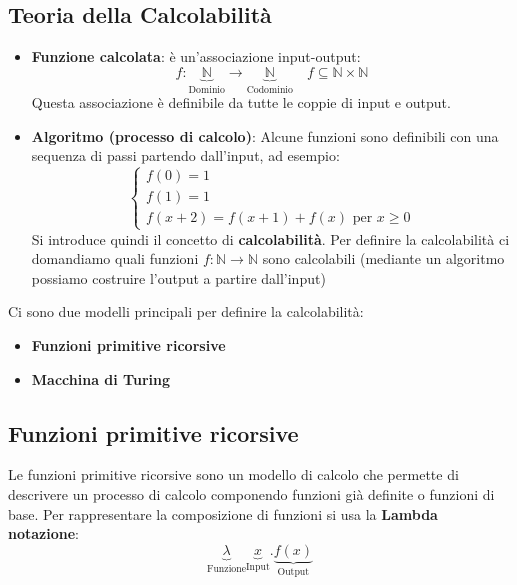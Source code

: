 \documentclass[a4paper]{article}
\begin{document}
\subsection{Teoria della Calcolabilità}
\begin{itemize}
  \item \textbf{Funzione calcolata}: è un'associazione input-output:
    \[
      f: \underbrace{\mathbb{N}}_{\text{Dominio}} \to
      \underbrace{\mathbb{N}}_{\text{Codominio}} \quad f \subseteq \mathbb{N} \times \mathbb{N}
    \]
    Questa associazione è definibile da tutte le coppie di input e output.  

  \item \textbf{Algoritmo (processo di calcolo)}:
  Alcune funzioni sono definibili con una sequenza di passi partendo dall'input, ad esempio:
    \[
      \begin{cases}
        f(0) = 1\\
        f(1) = 1\\
        f(x+2) = f(x+1) + f(x) \text{ per } x \ge 0
      \end{cases}
    \]
    Si introduce quindi il concetto di \textbf{calcolabilità}.
    Per definire la calcolabilità ci domandiamo quali funzioni \( f: \mathbb{N} \to \mathbb{N} \) sono calcolabili
    (mediante un algoritmo possiamo costruire l'output a partire dall'input)
\end{itemize}

\vspace{1em}
\noindent
Ci sono due modelli principali per definire la calcolabilità:
\begin{itemize}
  \item \textbf{Funzioni primitive ricorsive}
  \item \textbf{Macchina di Turing}
\end{itemize}

\subsection{Funzioni primitive ricorsive}
Le funzioni primitive ricorsive sono un modello di calcolo che permette di descrivere un
processo di calcolo componendo funzioni già definite o funzioni di base. Per rappresentare
la composizione di funzioni si usa la \textbf{Lambda notazione}:
\[
  \underbrace{\lambda}_{\text{Funzione}} \underbrace{x}_{\text{Input}}. \underbrace{f(x)}_{\text{Output}}
\] 
\end{document}
